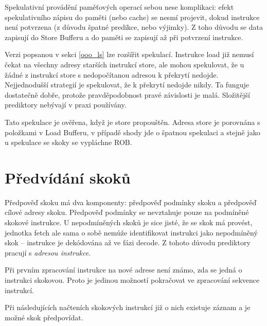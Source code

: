 Spekulativní provádění paměťových operací sebou nese komplikaci: efekt spekulativního zápisu do paměti (nebo cache) se nesmí projevit, dokud instrukce není potvrzena (z důvodu špatné predikce, nebo výjimky).
Z toho důvodu se data zapisují do Store Bufferu a do paměti se zapisují až při potvrzení instrukce.  

Verzi popsanou v sekci \ref{ooo_ls} lze rozšířit spekulací.
Instrukce load již nemusí čekat na všechny adresy starších instrukcí store, ale mohou spekulovat, že u žádné z instrukcí store s nedopočítanou adresou k překrytí nedojde.
Nejjednodušší strategií je spekulovat, že k překrytí nedojde nikdy.
Ta funguje dostatečně dobře, protože pravděpodobnost pravé závislosti je malá.
Složitější prediktory nebývají v praxi používány. 
\cite{moshovos1998memory}

Tato spekulace je ověřena, když je store propouštěn.
Adresa store je porovnána s položkami v Load Bufferu, v případě shody jde o špatnou spekulaci a stejně jako u spekulace se skoky se vypláchne ROB.


\section{Předvídání skoků}
\label{branchpredict}

Předpověď skoku má dva komponenty: předpověď podmínky skoku a předpověď cílové adresy skoku.
Předpověď podmínky se nevztahuje pouze na podmíněné skokové instrukce.
U nepodmíněných skoků je sice jisté, že se skok má provést, jednotka fetch ale sama o sobě nemůže identifikovat instrukci jako nepodmíněný skok -- instrukce je dekódována až ve fázi decode.
Z tohoto důvodu prediktory pracují s \emph{adresou instrukce}.

Při prvním zpracování instrukce na nové adrese není známo, zda se jedná o instrukci skokovou.
Proto je jedinou možností pokračovat ve zpracování sekvence instrukcí.

Při následujících načteních skokových instrukcí již o nich existuje záznam a je možné skok předpovídat.

